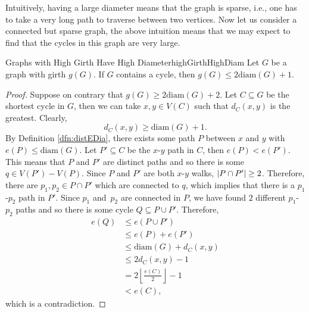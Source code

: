 \documentclass[math]{amznotes}
\theoremstyle{remark}
\begin{document}
Intuitively, having a large diameter means that the graph is sparse, i.e., one has to take a very long path to traverse between two vertices. Now let us consider a connected but sparse graph, the above intuition means that we may expect to find that the cycles in this graph are very large.
\begin{probox}{Graphs with High Girth Have High Diameter}{highGirthHighDiam}
    Let $G$ be a graph with girth $g(G)$. If $G$ contains a cycle, then $g(G) \leq 2\mathrm{diam}(G) + 1$.
    \tcblower
    \begin{proof}
        Suppose on contrary that $g(G) \geq 2\mathrm{diam}(G) + 2$. Let $C \subseteq G$ be the shortest cycle in $G$, then we can take $x, y \in V(C)$ such that $d_C(x, y)$ is the greatest. Clearly, 
        \begin{equation*}
            d_C(x, y) \geq \mathrm{diam}(G) + 1.
        \end{equation*}
        By Definition \ref{dfn:distEDia}, there exists some path $P$ between $x$ and $y$ with $e(P) \leq \mathrm{diam}(G)$. Let $P' \subseteq C$ be the $x$-$y$ path in $C$, then $e(P) < e(P')$. This means that $P$ and $P'$ are distinct paths and so there is some $q \in V(P') - V(P)$. Since $P$ and $P'$ are both $x$-$y$ walks, ${\left\lvert {P \cap P'} \right\rvert} \geq 2$. Therefore, there are $p_1, p_2 \in P \cap P'$ which are connected to $q$, which implies that there is a $p_1$-$p_2$ path in $P'$. Since $p_1$ and~$p_2$ are connected in $P$, we have found $2$ different $p_1$-$p_2$ paths and so there is some cycle $Q \subseteq P \cup P'$. Therefore,
        \begin{align*}
            e(Q) & \leq e(P\cup P') \\
            & \leq e(P) + e(P') \\
            & \leq \mathrm{diam}(G) + d_C(x, y) \\
            & \leq 2d_C(x, y) - 1 \\
            & = 2\left\lfloor\frac{e(C)}{2}\right\rfloor - 1 \\
            & < e(C),
        \end{align*}
        which is a contradiction.
    \end{proof}
\end{probox}
\end{document}
